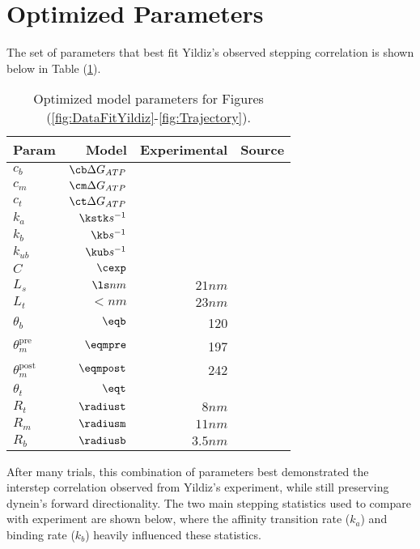 \section{Optimized Parameters}\label{sec:Params}
The set of parameters that best fit Yildiz's observed stepping correlation is shown below in Table (\ref{tab:params}).

\begin{table}[H]
  \centering
  \begin{tabular}{|l | r | r | r|}
  	\hline
    Param & Model & Experimental & Source \\
    \hline
    $c_b$ & $\cb \Delta G_{ATP}$ &  & \\
    $c_m$ & $\cm \Delta G_{ATP}$ &  & \\
    $c_t$ & $\ct \Delta G_{ATP}$ &  & \\
    $k_a$ & $\kstk s^{-1}$&  & \\
    $k_b$ & $\kb s^{-1}$&  & \\
    $k_{ub}$ & $\kub s^{-1}$ & & \\
    $C$ & $\cexp$ & & \\
    $L_s$ & $\ls nm$ & $21nm$ & \cite{Burgess2003, 3vkh-cite, carter-paper}\\
    $L_t$ & $\lt nm$ & $23nm$ & \cite{Burgess2003, 3vkh-cite, carter-paper}\\
    $\theta_b$ & $\eqb$ &  120 & \cite{leschziner} \\
    $\theta_m^{\mbox{pre}}$ & $\eqmpre$ &  197 & \cite{Burgess2003}\\
    $\theta_m^{\mbox{post}}$ & $\eqmpost$ & 242 & \cite{Burgess2003}\\
    $\theta_t$ & $\eqt$ &  & \\
    $R_t$ & $\radiust$ & $8nm$ & \cite{Burgess2003}\\
    $R_m$ & $\radiusm$ & $11nm$ & \cite{Burgess2003}\\
    $R_b$ & $\radiusb$ & $3.5nm$ & \cite{Burgess2003}\\
    \hline
  \end{tabular}
  \caption{Optimized model parameters for Figures (\ref{fig:DataFitYildiz}-\ref{fig:Trajectory}).}
  \label{tab:params}
\end{table}

After many trials, this combination of parameters best demonstrated the interstep correlation observed from Yildiz's experiment, while still preserving dynein's forward directionality. The two main stepping statistics used to compare with experiment are shown below, where the affinity transition rate ($k_a$) and binding rate ($k_b$) heavily influenced these statistics.  

